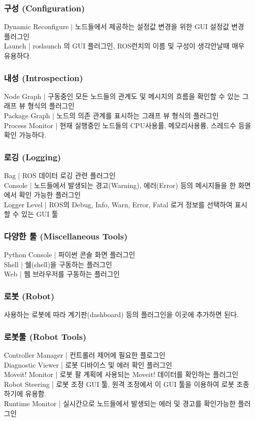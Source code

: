 \subsubsection{구성 (Configuration)}
Dynamic Reconfigure | 노드들에서 제공하는 설정값 변경을 위한 GUI 설정값 변경 플러그인\\
Launch | roslaunch 의 GUI 플러그인, ROS런치의 이름 및 구성이 생각안날때 매우 유용하다.\\
\subsubsection{내성 (Introspection)}
Node Graph | 구동중인 모든 노드들의 관계도 및 메시지의 흐름을 확인할 수 있는 그래프 뷰 형식의 플러그인\\
Package Graph | 노드의 의존 관계를 표시하는 그래프 뷰 형식의 플러그인\\
Process Monitor | 현재 실행중인 노드들의 CPU사용률, 메모리사용륭, 스레드수 등을 확인 가능하다.\\
\subsubsection{로깅 (Logging)}
Bag | ROS 데이터 로깅 관련 플러그인\\
Console | 노드들에서 발생되는 경고(Warning), 에러(Error) 등의 메시지들을 한 화면에서 확인 가능한 플러그인\\
Logger Level | ROS의 Debug, Info, Warn, Error, Fatal 로거 정보를 선택하여 표시할 수 있는 GUI 툴\\
\subsubsection{다양한 툴 (Miscellaneous Tools)}
Python Console | 파이썬 콘솔 화면 플러그인\\
Shell | 쉘(shell)을 구동하는 플러그인\\
Web | 웹 브라우저를 구동하는 플러그인\\
\subsubsection{로봇 (Robot)}
사용하는 로봇에 따라 계기판(dashboard) 등의 플러그인을 이곳에 추가하면 된다. \\
\subsubsection{로봇툴 (Robot Tools)}
Controller Manager | 컨트롤러 제어에 필요한 플로그인\\
Diagnostic Viewer | 로봇 디바이스 및 에러 확인 플러그인\\
Moveit! Monitor | 로봇 팔 계획에 사용되는 Moveit! 데이터를 확인하는 플러그인\\
Robot Steering | 로봇 조정 GUI 툴, 원격 조정에서 이 GUI 툴을 이용하여 로봇 조종하기에 유용함.\\
Runtime Monitor | 실시간으로 노드들에서 발생되는 에러 및 경고를 확인가능한 플러그인\\
